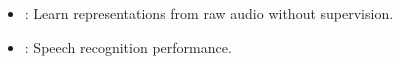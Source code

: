 \begin{frame}
\begin{columns}[t]
\begin{column}{0.40\textwidth}
{\begin{itemize}
                \item {}: Learn representations from raw audio without supervision.
                \item {}: Speech recognition performance.
            \end{itemize}
            }
        \end{column}
        \begin{column}{0.30\textwidth}
            \begin{figure}[2.333\textwidth]
            \end{figure}
        \end{column}
        \hspace{0.020\textwidth}
    \end{columns}
\end{frame}


